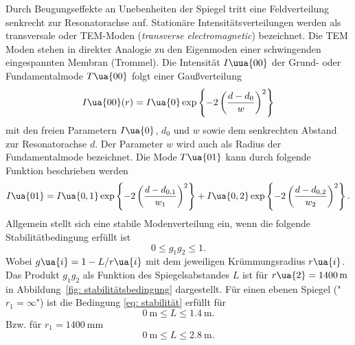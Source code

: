 Durch Beugungseffekte an Unebenheiten der Spiegel tritt eine Feldverteilung senkrecht zur Resonatorachse auf. Stationäre Intensitätsverteilungen
werden als transversale oder TEM-Moden (\textit{transverse electromagnetic}) bezeichnet. Die TEM Moden stehen in direkter Analogie zu den Eigenmoden
einer schwingenden eingespannten Membran (Trommel). Die Intensität $I\uua{00}$ der Grund- oder Fundamentalmode $T\ua{00}$ folgt einer Gaußverteilung
\begin{equation}
  I\ua{00}(r) = I\ua{0}\exp\left\{- 2\left(\frac{d-d_0}{w}\right)^2\right\}
  \label{eq: tem00}
\end{equation}
mit den freien Parametern $I\ua{0}$, $d_0$ und $w$ sowie dem senkrechten Abstand zur Resonatorachse $d$. Der Parameter $w$ wird auch als Radius
der Fundamentalmode bezeichnet. Die Mode $T\ua{01}$ kann durch folgende Funktion beschrieben werden
\begin{equation}
  I\ua{01} = I\ua{0, 1}\exp\left\{- 2\left(\frac{d-d_{0, 1}}{w_{1}}\right)^2\right\} + I\ua{0, 2}\exp\left\{- 2\left(\frac{d-d_{0,2}}{w_{2}}\right)^2\right\}.
  \label{eq: tem01}
\end{equation}
Allgemein stellt sich eine stabile Modenverteilung
ein, wenn die folgende Stabilitätbedingung erfüllt ist
\begin{equation}
  0 \leq g_1 g_2 \leq 1.
  \label{eq: stabilität}
\end{equation}
Wobei $g\ua{i} = 1 - L/r\ua{i}$ mit dem jeweiligen Krümmungsradius $r\ua{i}$. Das Produkt $g_1g_2$
als Funktion des Spiegelsabstandes $L$ ist für $r\ua{2} = \SI{1400}{\meter}$ in Abbildung~\ref{fig: stabilitätsbedingung} dargestellt.
Für einen ebenen Spiegel ("$r_1 = \infty$") ist die Bedingung \eqref{eq: stabilität} erfüllt für
\begin{equation}
  \SI{0}{\meter}\leq L \leq \SI{1.4}{\meter}.
\end{equation}
Bzw. für $r_1 = \SI{1400}{\milli\meter}$
\begin{equation}
  \SI{0}{\meter} \leq L \leq \SI{2.8}{\meter}.
\end{equation}

